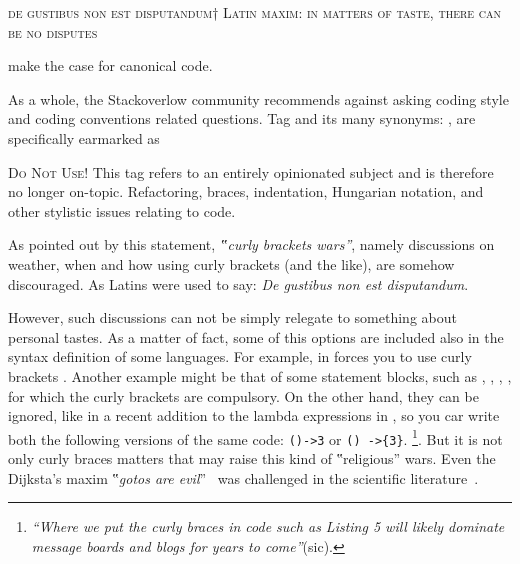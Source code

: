 \textsc{de gustibus non est disputandum†{%
    Latin maxim: in matters of taste, there can be no disputes
}}

make the case for canonical code.


As a whole, the Stackoverlow community
recommends against asking coding style and coding conventions related questions.
Tag  and its many synonyms: ,
 are specifically
earmarked as

\begin{tcolorbox}[colback=green!5!white,colframe=blue!25!white,notitle]
    \textsc{Do Not Use!}
This tag refers to an entirely opinionated subject and is therefore
no longer on-topic. Refactoring, braces, indentation, Hungarian notation, and
other stylistic issues relating to code.
\end{tcolorbox}

As pointed out by this statement, \emph{‟curly brackets wars”}, namely discussions
on weather, when and how using curly brackets (and the like), are somehow discouraged.
As Latins were used to say: \emph{De gustibus non est disputandum}.

However, such discussions can not be simply relegate to something about personal
tastes. 
As a matter of fact, some of this options are included also in the syntax definition of some languages.
For example, in \Go forces you to use curly brackets .
Another example might be that of some \Java statement blocks, such as , , ,
, for which the curly brackets are compulsory.
On the other hand, they can be ignored, like in a recent addition to
the lambda expressions 
in \Java, so you car write both the following versions of the same code: \texttt{()->3} or \texttt{() ->\{3\}}.
\footnote{%
\emph{``Where we put the curly braces in code such as Listing 5 will likely dominate \Java message boards and blogs for years to come''}(sic).
}.
But it is not only curly braces matters that may raise
this kind of ‟religious” wars. Even the Dijksta's maxim ‟\emph{gotos are evil}”~\cite{Dijkstra:68} 
was challenged in the scientific literature~\cite{Knuth:74,Ramshaw:88,Bochmann:73,Sennesh:Gil:16,Zoethout:79,Wulf:79,Clark:84}.

